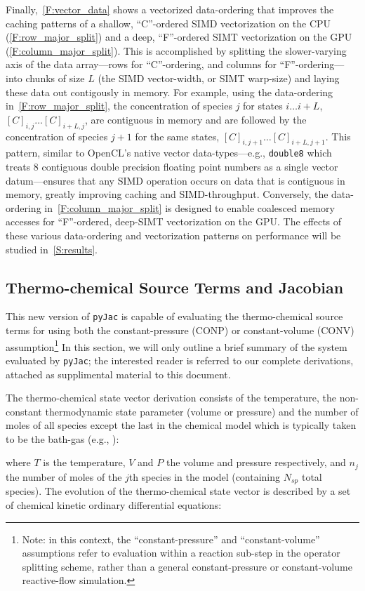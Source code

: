 \documentclass[12pt,number,sort&compress]{elsarticle}
\newcommand{\loadeq}[1]{%
   \ExecuteMetaData[eqn_dict.tex]{eq#1}%
}
\newcommand{\ns}{N_{sp}}
\newcommand{\conp}{CONP}
\newcommand{\conv}{CONV}
\begin{document}
Finally,~\cref{F:vector_data} shows a vectorized data-ordering that improves the caching patterns of a shallow, ``C''-ordered SIMD vectorization on the CPU (\cref{F:row_major_split}) and a deep, ``F''-ordered SIMT vectorization on the GPU (\cref{F:column_major_split}).
This is accomplished by splitting the slower-varying axis of the data array---rows for ``C''-ordering, and columns for ``F''-ordering---into chunks of size $L$ (the SIMD vector-width, or SIMT warp-size) and laying these data out contigously in memory.
For example, using the data-ordering in~\cref{F:row_major_split}, the concentration of species $j$ for states $i\ldots i+L$, $[C]_{i, j} \ldots [C]_{i + L, j}$, are contiguous in memory and are followed by the concentration of species $j + 1$ for the same states, $[C]_{i, j + 1} \ldots [C]_{i + L, j + 1}$.
This pattern, similar to OpenCL's native vector data-types---e.g., \texttt{double\num{8}} which treats \num{8} contiguous double precision floating point numbers as a single vector datum---ensures that any SIMD operation occurs on data that is contiguous in memory, greatly improving caching and SIMD-throughput.
Conversely, the data-ordering in~\cref{F:column_major_split} is designed to enable coalesced memory accesses for ``F''-ordered, deep-SIMT vectorization on the GPU.
The effects of these various data-ordering and vectorization patterns on performance will be studied in~\cref{S:results}.

\subsection{Thermo-chemical Source Terms and Jacobian}
This new version of \texttt{pyJac} is capable of evaluating the thermo-chemical source terms for using both the constant-pressure (\conp) or constant-volume (\conv) assumption\footnote{Note: in this context, the ``constant-pressure'' and ``constant-volume'' assumptions refer to evaluation within a reaction sub-step in the operator splitting scheme, rather than a general constant-pressure or constant-volume reactive-flow simulation.}
In this section, we will only outline a brief summary of the system evaluated by \texttt{pyJac}; the interested reader is referred to our complete derivations, attached as supplimental material to this document.

The thermo-chemical state vector derivation consists of the temperature, the non-constant thermodynamic state parameter (volume or pressure) and the number of moles of all species except the last in the chemical model which is typically taken to be the bath-gas (e.g., ):
\loadeq{state}
where $T$ is the temperature, $V$ and $P$ the volume and pressure respectively, and $n_j$ the number of moles of the $j$th species in the model (containing $\ns$ total species).
The evolution of the thermo-chemical state vector is described by a set of chemical kinetic ordinary differential equations:
\loadeq{dstate}
\end{document}
